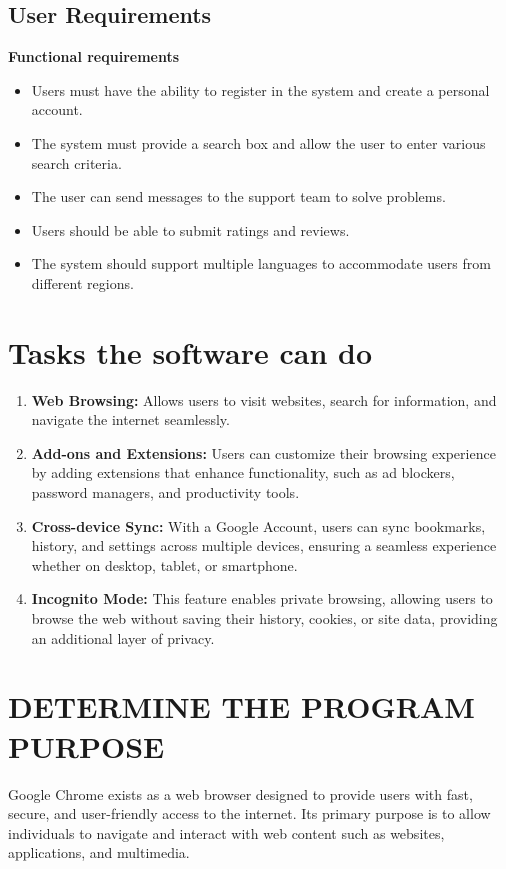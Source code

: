 \documentclass[a4paper,12pt]{article}
\begin{document}
\subsection{User Requirements}
\textbf{Functional requirements}
\begin{itemize}
    \item Users must have the ability to register in the system and create a personal account.
    \item The system must provide a search box and allow the user to enter various search criteria.
    \item The user can send messages to the support team to solve problems.
    \item Users should be able to submit ratings and reviews.
    \item The system should support multiple languages to accommodate users from different regions.
\end{itemize}

\section{Tasks the software can do}
\begin{enumerate}
    \item \textbf{Web Browsing:} Allows users to visit websites, search for information, and navigate the internet seamlessly.
    \item \textbf{Add-ons and Extensions:} Users can customize their browsing experience by adding extensions that enhance functionality, such as ad blockers, password managers, and productivity tools.
    \item \textbf{Cross-device Sync:} With a Google Account, users can sync bookmarks, history, and settings across multiple devices, ensuring a seamless experience whether on desktop, tablet, or smartphone.
    \item \textbf{Incognito Mode:} This feature enables private browsing, allowing users to browse the web without saving their history, cookies, or site data, providing an additional layer of privacy.
\end{enumerate}

\section{DETERMINE THE PROGRAM PURPOSE}
Google Chrome exists as a web browser designed to provide users with fast, secure, and user-friendly access to the internet. Its primary purpose is to allow individuals to navigate and interact with web content such as websites, applications, and multimedia.
\end{document}
